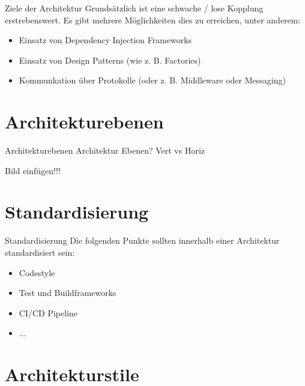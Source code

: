 \documentclass{beamer}
\begin{document}
\begin{frame}{Ziele der Architektur}
	Grundsätzlich ist eine schwache / lose Kopplung erstrebenswert.
	Es gibt mehrere Möglichkeiten dies zu erreichen, unter anderem:

	\begin{itemize}
		\item{Einsatz von Dependency Injection Frameworks}
		\item{Einsatz von Design Patterns (wie z. B. Factories)}
		\item{Kommunkation über Protokolle (oder z. B. Middleware oder
			Messaging)}
	\end{itemize}
\end{frame}

\section{Architekturebenen}

\begin{frame}{Architekturebenen}
	Architektur Ebenen? Vert vs Horiz

	Bild einfügen!!!
\end{frame}

\section{Standardisierung}

\begin{frame}{Standardisierung}
	Die folgenden Punkte sollten innerhalb einer Architektur standardisiert sein:

	\begin{itemize}
		\item Codestyle
		\item Test und Buildframeworks
		\item CI/CD Pipeline
		\item ...
	\end{itemize}
\end{frame}

\section{Architekturstile}
\end{document}
